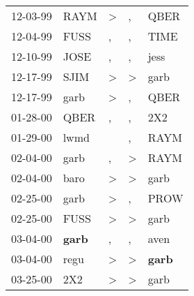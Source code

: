 \begin{supertabular}{p{0.07\textwidth}p{0.06\textwidth}p{0.02\textwidth}p{0.02\textwidth}p{0.06\textwidth}}
          12-03-99\textsuperscript{} &           RAYM\textsuperscript{} &     \textgreater &                , &           QBER\textsuperscript{} \\
          12-04-99\textsuperscript{} &           FUSS\textsuperscript{} &                , &                , &           TIME\textsuperscript{} \\
          12-10-99\textsuperscript{} &           JOSE\textsuperscript{} &                , &                , &           jess\textsuperscript{} \\
          12-17-99\textsuperscript{} &           SJIM\textsuperscript{} &     \textgreater &     \textgreater &           garb\textsuperscript{} \\
          12-17-99\textsuperscript{} &           garb\textsuperscript{} &     \textgreater &                , &           QBER\textsuperscript{} \\
          01-28-00\textsuperscript{} &           QBER\textsuperscript{} &                , &                , &            2X2\textsuperscript{} \\
          01-29-00\textsuperscript{} &           lwmd\textsuperscript{} &                  &                , &           RAYM\textsuperscript{} \\
          02-04-00\textsuperscript{} &           garb\textsuperscript{} &                , &     \textgreater &           RAYM\textsuperscript{} \\
          02-04-00\textsuperscript{} &           baro\textsuperscript{} &     \textgreater &     \textgreater &           garb\textsuperscript{} \\
          02-25-00\textsuperscript{} &           garb\textsuperscript{} &     \textgreater &                , &           PROW\textsuperscript{} \\
          02-25-00\textsuperscript{} &           FUSS\textsuperscript{} &     \textgreater &     \textgreater &           garb\textsuperscript{} \\
          03-04-00\textsuperscript{} &  \textbf{garb\textsuperscript{}} &                , &                , &           aven\textsuperscript{} \\
          03-04-00\textsuperscript{} &           regu\textsuperscript{} &     \textgreater &     \textgreater &  \textbf{garb\textsuperscript{}} \\
          03-25-00\textsuperscript{} &            2X2\textsuperscript{} &     \textgreater &     \textgreater &           garb\textsuperscript{} \\

\end{supertabular}
